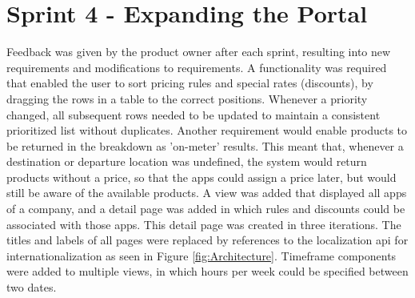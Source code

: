 %
\section{Sprint 4 - Expanding the Portal}
Feedback was given by the product owner after each sprint, resulting into new requirements and modifications to requirements. A functionality was required that enabled the user to sort pricing rules and special rates (discounts), by dragging the rows in a table to the correct positions. Whenever a priority changed, all subsequent rows needed to be updated to maintain a consistent prioritized list without duplicates. Another requirement would enable products to be returned in the breakdown as 'on-meter' results. This meant that, whenever a destination or departure location was undefined, the system would return products without a price, so that the apps could assign a price later, but would still be aware of the available products. A view was added that displayed all apps of a company, and a detail page was added in which rules and discounts could be associated with those apps. This detail page was created in three iterations. The titles and labels of all pages were replaced by references to the localization api for internationalization as seen in Figure \ref{fig:Architecture}. Timeframe components were added to multiple views, in which hours per week could be specified between two dates.

%
